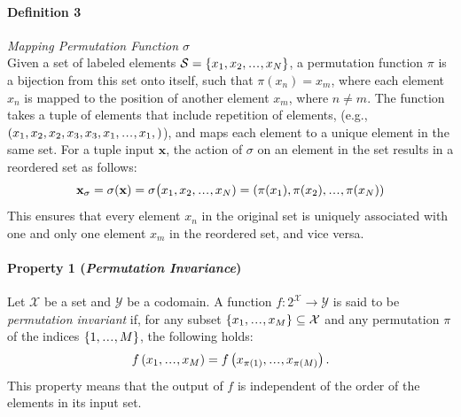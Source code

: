 \documentclass{article}
\newcommand{\perminv}{\emph{Permutation Invariance}}
\newcommand\sdots{\makebox[1em][c]{.\hfil.\hfil.}}
\begin{document}
\paragraph{Definition 3} \emph{Mapping Permutation Function \(\sigma\)}\\
Given a set of labeled elements \( \mathcal{S} = \{x_1, x_2, \sdots, x_N\} \), a permutation function \(\pi\) is a bijection from this set onto itself, such that  \(\pi(x_n) = x_m\),
where each element \( x_n \) is mapped to the position of another element \( x_m \), where $n \neq m$.
The function takes a tuple of elements that include repetition of elements,
(e.g., $(x_1, x_2, x_2,x_3, x_3,x_1,\sdots,x_1,)$),
and maps each element to a unique element in the same set.
For a tuple input $\mathbf{x}$, the action of \(\sigma\) on an element in the set results in a reordered set as follows:
\begin{align}
  \mathbf{x_{\sigma}} = \sigma(\mathbf{x}) = \sigma\big(x_1, x_2,\sdots,x_N) = (\pi(x_1), \pi(x_2), \sdots, \pi(x_N))
\end{align}
This ensures that every element \( x_n \) in the original set is uniquely associated with one and only one element \( x_m \) in the reordered set, and vice versa.

\paragraph{Property 1 (\perminv)}
\label{par:permutation_invariance}
Let $\mathcal{X}$ be a set and $\mathcal{Y}$ be a codomain. A function $f: 2^{\mathcal{X}} \rightarrow \mathcal{Y}$ is said to be \textit{permutation invariant}
if, for any subset $\{x_1, \sdots, x_M\} \subseteq \mathcal{X}$ and any permutation $\pi$ of the indices $\{1, \sdots, M\}$, the following holds:
\begin{align}
  f\left(x_1, \sdots, x_M\right) = f\left(x_{\pi(1)}, \sdots, x_{\pi(M)}\right).
\end{align}
This property means that the output of $f$ is independent of the order of the elements in its input set.
\end{document}
